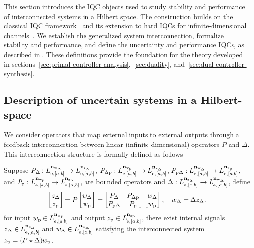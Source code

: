 
This section introduces the IQC objects used to study stability and performance
of interconnected systems in a Hilbert space. The construction builds on the
classical IQC framework~\cite{megretski1997system} and its
extension to hard IQCs for infinite-dimensional
channels~\cite{10156335}. We establish the generalized
system interconnection, formalize stability and performance, and define the
uncertainty and performance IQCs, as described in \cite{lenssen2025muanalysissynthesisframeworkpartial}. These definitions provide the foundation for
the theory developed in sections~\ref{sec:primal-controller-analysis},~\ref{sec:duality}, and~\ref{sec:dual-controller-synthesis}.

\subsection{Description of uncertain systems in a Hilbert-space}
We consider operators that map external inputs to external outputs through a
feedback interconnection between linear (infinite dimensional) operators $P$
and $\Delta$.
This interconnection structure is formally defined as follows
\begin{definition}\label{def:uncertain-interconnection}
Suppose
$P_\Delta :
L_{{\mathrm{e}},[a,b]}^{\mathbf{n}_{{\mathrm{w}}_\Delta}}
\to
L_{{\mathrm{e}},[a,b]}^{\mathbf{n}_{{\mathrm{z}}_\Delta}}$,
$P_{\Delta{\mathrm{p}}} :
L_{{\mathrm{e}},[a,b]}^{\mathbf{n}_{{\mathrm{w}}_{{\mathrm{p}}}}}
\to
L_{{\mathrm{e}},[a,b]}^{\mathbf{n}_{{\mathrm{z}}_\Delta}}$,
$P_{{\mathrm{p}}\Delta} :
L_{{\mathrm{e}},[a,b]}^{\mathbf{n}_{{\mathrm{w}}_\Delta}}
\to
L_{{\mathrm{e}},[a,b]}^{\mathbf{n}_{{\mathrm{z}}_{{\mathrm{p}}}}}$,
and $P_{{\mathrm{p}}} :
L_{{\mathrm{e}},[a,b]}^{\mathbf{n}_{{\mathrm{w}}_{{\mathrm{p}}}}}
\to
L_{{\mathrm{e}},[a,b]}^{\mathbf{n}_{{\mathrm{z}}_{{\mathrm{p}}}}}$,
are bounded operators and $\Delta :
L_{{\mathrm{e}},[a,b]}^{\mathbf{n}_{{\mathrm{z}}_\Delta}}
\to
L_{{\mathrm{e}},[a,b]}^{\mathbf{n}_{{\mathrm{w}}_\Delta}}$, define
\begin{equation}\label{eq:uncertain-map}
\begin{bmatrix}z_\Delta\\ z_{{\mathrm{p}}}\end{bmatrix}
= P\begin{bmatrix}w_\Delta\\ w_{{\mathrm{p}}}\end{bmatrix} =
\begin{bmatrix}
P_\Delta & P_{\Delta{\mathrm{p}}} \\
P_{{\mathrm{p}}\Delta} & P_{{\mathrm{p}}}
\end{bmatrix}\begin{bmatrix}w_\Delta\\ w_{{\mathrm{p}}}\end{bmatrix},
\quad
w_\Delta=\Delta z_\Delta.
\end{equation}
for input $w_{{\mathrm{p}}} \in L_{{\mathrm{e}},[a,b]}^{\mathbf{n}_{{\mathrm{w}}_{{\mathrm{p}}}}}$ and output
$z_{{\mathrm{p}}}\in L_{{\mathrm{e}},[a,b]}^{\mathbf{n}_{{\mathrm{z}}_{{\mathrm{p}}}}}$, there exist internal signals
$z_\Delta \in L_{{\mathrm{e}},[a,b]}^{\mathbf{n}_{{\mathrm{z}}_\Delta}}$ and
$w_\Delta \in L_{{\mathrm{e}},[a,b]}^{\mathbf{n}_{{\mathrm{w}}_\Delta}}$
satisfying the {interconnected system} $z_{{\mathrm{p}}}= (P\star\Delta)w_{{\mathrm{p}}}$.
\end{definition}
